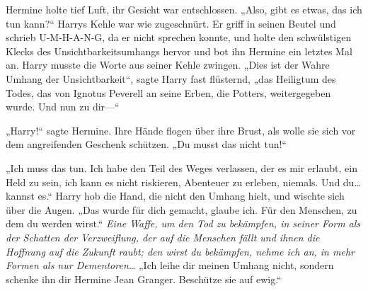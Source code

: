 Hermine holte tief Luft, ihr Gesicht war entschlossen.
„Also, gibt es etwas, das ich tun kann?“
Harrys Kehle war wie zugeschnürt. Er griff in seinen Beutel und schrieb U-M-H-A-N-G, da er nicht sprechen konnte, und holte den schwülstigen Klecks des Unsichtbarkeitsumhangs hervor und bot ihn Hermine ein letztes Mal an. Harry musste die Worte aus seiner Kehle zwingen.
„Dies ist der Wahre Umhang der Unsichtbarkeit“, sagte Harry fast flüsternd, „das Heiligtum des Todes, das von Ignotus Peverell an seine Erben, die Potters, weitergegeben wurde. Und nun zu dir—“

„Harry!“ sagte Hermine. Ihre Hände flogen über ihre Brust, als wolle sie sich vor dem angreifenden Geschenk schützen.
„Du musst das nicht tun!“

„Ich muss das tun. Ich habe den Teil des Weges verlassen, der es mir erlaubt, ein Held zu sein, ich kann es nicht riskieren, Abenteuer zu erleben, niemals. Und du…kannst es.“ Harry hob die Hand, die nicht den Umhang hielt, und wischte sich über die Augen. „Das wurde für dich gemacht, glaube ich. Für den Menschen, zu dem du werden wirst.“
\emph{Eine Waffe, um den Tod zu bekämpfen, in seiner Form als der Schatten der Verzweiflung, der auf die Menschen fällt und ihnen die Hoffnung auf die Zukunft raubt; den wirst du bekämpfen, nehme ich an, in mehr Formen als nur Dementoren…}
„Ich leihe dir meinen Umhang nicht, sondern schenke ihn dir Hermine Jean Granger. Beschütze sie auf ewig.“

